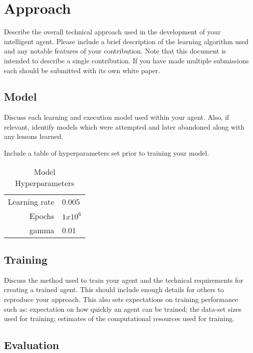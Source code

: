 \documentclass{article}
\begin{document}
\section{Approach}
\label{sec:approach}
Describe the overall technical approach used in the development of your intelligent agent.  Please include a brief description of the learning algorithm used and any notable features of your contribution.  Note that this document is intended to describe a single contribution.  If you have made multiple submissions each should be submitted with its own white paper.


\subsection{Model}
\label{sec:model}
Discuss each learning and execution model used within your agent. Also, if relevant, identify models which were attempted and later abandoned along with any lessons learned.

Include a table of hyperparameters set prior to training your model. 

\begin{table}[]

    \centering
    \begin{tabular}{r|l}
        \hline
        Learning rate & 0.005 \\
        Epochs & $1x10^{6}$ \\
        gamma & 0.01 \\
        \hline
    \end{tabular}
    \caption{Model Hyperparameters}
    \label{tab:hyperparameters}
\end{table}

\subsection{Training}
\label{sec:training}

Discuss the method used to train your agent and the technical requirements for creating a trained agent.  This should include enough details for others to reproduce your approach.  This also sets expectations on training performance such as: expectation on how quickly an agent can be trained; the data-set sizes used for training; estimates of the computational resources used for training. 

\subsection{Evaluation}
\label{sec:performance}
\end{document}
